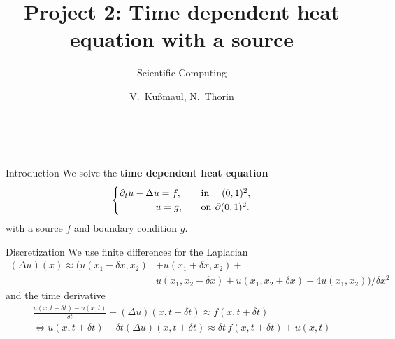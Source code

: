 \documentclass[11pt,aspectratio=1610]{beamer}
\title{Project 2: Time dependent heat equation with a source}
\subtitle{\small{Scientific Computing}
}
\author{V.~Ku{\ss}maul, N.~Thorin}
\date{\, }
\begin{document}

\begin{frame}
	\titlepage
\end{frame}



\begin{frame}{Introduction} 
	We solve the \textbf{time dependent heat equation}
	\begin{align*}
	\begin{cases}
		\partial_t u - \Delta u = f,& \quad \text{in} \: \, \hspace{2mm} (0,1)^2,\\ 
		\hspace{13mm} u = g,& \quad \text{on} \: \, \partial (0,1)^2. 
	\end{cases}
	\end{align*}
	with a source $f$ and boundary condition $g$. 
	
\end{frame}

\begin{frame}{Discretization}
We use finite differences for the Laplacian
	\begin{align*}
		(\Delta u)(x) \approx  \big( u(x_1 - \delta x, x_2)& + u(x_1 + \delta x, x_2) + \\ 
			&u(x_1, x_2 - \delta x) + u(x_1, x_2 + \delta x) - 4 u(x_1, x_2) \big) / \delta x^2
	\end{align*}
and the time derivative 
	\begin{align*}  
		\frac{u(x, t + \delta t) - u(x, t)}{\delta t} - (\Delta u)(x, t + \delta t) \approx f(x, t + \delta t) \\ 
		\iff u(x, t + \delta t) - \delta t (\Delta u)(x, t + \delta t) \approx \delta t \,  f(x, t + \delta t) + u(x, t)
	\end{align*} 


\end{frame}
\end{document}
